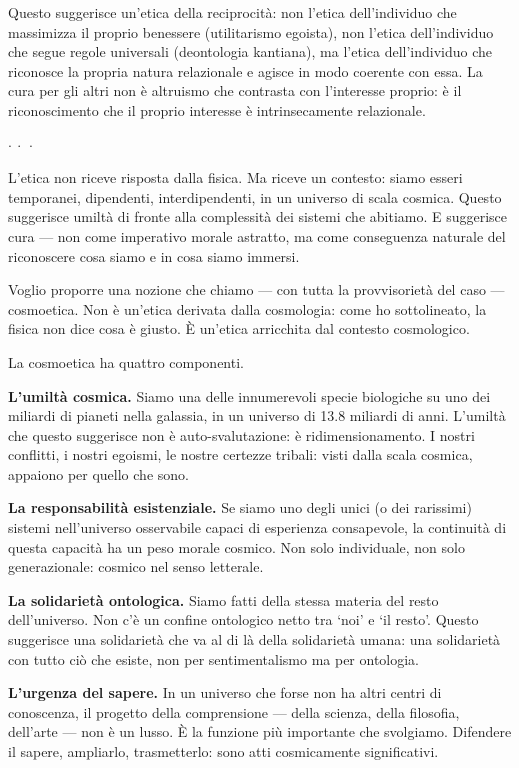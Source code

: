 \documentclass[12pt,a4paper,openany]{book}
\newcommand{\sezione}[1]{\vspace{1.2em}{\large\bfseries #1}\vspace{0.5em}\par}
\newcommand{\puntini}{\begin{center}$\cdot\ \cdot\ \cdot$\end{center}\vspace{0.3em}}
\begin{document}
Questo suggerisce un'etica della reciprocità: non l'etica dell'individuo che massimizza il proprio benessere (utilitarismo egoista), non l'etica dell'individuo che segue regole universali (deontologia kantiana), ma l'etica dell'individuo che riconosce la propria natura relazionale e agisce in modo coerente con essa. La cura per gli altri non è altruismo che contrasta con l'interesse proprio: è il riconoscimento che il proprio interesse è intrinsecamente relazionale.

\puntini

L'etica non riceve risposta dalla fisica. Ma riceve un contesto: siamo esseri temporanei, dipendenti, interdipendenti, in un universo di scala cosmica. Questo suggerisce umiltà di fronte alla complessità dei sistemi che abitiamo. E suggerisce cura --- non come imperativo morale astratto, ma come conseguenza naturale del riconoscere cosa siamo e in cosa siamo immersi.

\sezione{Una cosmoetica: il significato cosmico della responsabilità}

Voglio proporre una nozione che chiamo --- con tutta la provvisorietà del caso --- cosmoetica. Non è un'etica derivata dalla cosmologia: come ho sottolineato, la fisica non dice cosa è giusto. È un'etica arricchita dal contesto cosmologico.

La cosmoetica ha quattro componenti.

\textbf{L'umiltà cosmica.} Siamo una delle innumerevoli specie biologiche su uno dei miliardi di pianeti nella galassia, in un universo di 13.8 miliardi di anni. L'umiltà che questo suggerisce non è auto-svalutazione: è ridimensionamento. I nostri conflitti, i nostri egoismi, le nostre certezze tribali: visti dalla scala cosmica, appaiono per quello che sono.

\textbf{La responsabilità esistenziale.} Se siamo uno degli unici (o dei rarissimi) sistemi nell'universo osservabile capaci di esperienza consapevole, la continuità di questa capacità ha un peso morale cosmico. Non solo individuale, non solo generazionale: cosmico nel senso letterale.

\textbf{La solidarietà ontologica.} Siamo fatti della stessa materia del resto dell'universo. Non c'è un confine ontologico netto tra `noi' e `il resto'. Questo suggerisce una solidarietà che va al di là della solidarietà umana: una solidarietà con tutto ciò che esiste, non per sentimentalismo ma per ontologia.

\textbf{L'urgenza del sapere.} In un universo che forse non ha altri centri di conoscenza, il progetto della comprensione --- della scienza, della filosofia, dell'arte --- non è un lusso. È la funzione più importante che svolgiamo. Difendere il sapere, ampliarlo, trasmetterlo: sono atti cosmicamente significativi.
\end{document}

